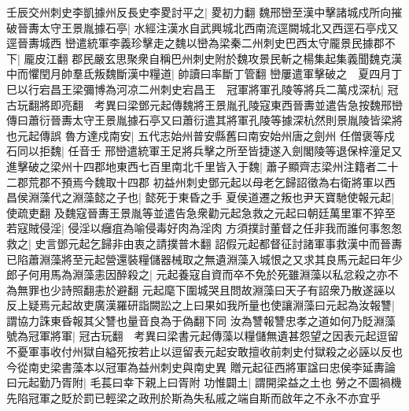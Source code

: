 壬辰交州刺史李凱據州反長史李畟討平之|{
	畟初力翻}
魏邢巒至漢中擊諸城戍所向摧破晉夀太守王景胤據石亭|{
	水經注漢水自武興城北西南流逕闕城北又西逕石亭戍又逕晉夀城西}
巒遣統軍李義珍擊走之魏以巒為梁秦二州刺史巴西太守龎景民據郡不下|{
	龎皮江翻}
郡民嚴玄思聚衆自稱巴州刺史附於魏攻景民斬之楊集起集義聞魏克漢中而懼閏月帥羣氐叛魏斷漢中糧道|{
	帥讀曰率斷丁管翻}
巒屢遣軍擊破之　夏四月丁巳以行宕昌王梁彌博為河凉二州刺史宕昌王　冠軍將軍孔陵等將兵二萬戍深杭|{
	冠古玩翻將即亮翻　考異曰梁鄧元起傳魏將王景胤孔陵寇東西晉夀並遣告急按魏邢巒傳曰蕭衍晉夀太守王景胤據石亭又曰蕭衍遣其將軍孔陵等據深杭然則景胤陵皆梁將也元起傳誤}
魯方達戍南安|{
	五代志始州普安縣舊曰南安始州唐之劍州}
任僧褒等戍石同以拒魏|{
	任音壬}
邢巒遣統軍王足將兵擊之所至皆捷遂入劍閣陵等退保梓潼足又進擊破之梁州十四郡地東西七百里南北千里皆入于魏|{
	蕭子顯齊志梁州注籍者二十二郡荒郡不預焉今魏取十四郡}
初益州刺史鄧元起以母老乞歸詔徵為右衛將軍以西昌侯淵藻代之淵藻懿之子也|{
	懿死于東昏之手}
夏侯道遷之叛也尹天寶馳使報元起|{
	使疏吏翻}
及魏寇晉夀王景胤等並遣告急衆勸元起急救之元起曰朝廷萬里軍不猝至若寇賊侵淫|{
	侵淫以癰疽為喻侵毒好肉為淫肉}
方須撲討董督之任非我而誰何事怱怱救之|{
	史言鄧元起乞歸非由衷之請撲普木翻}
詔假元起都督征討諸軍事救漢中而晉夀已陷蕭淵藻將至元起營還裝糧儲器械取之無遺淵藻入城恨之又求其良馬元起曰年少郎子何用馬為淵藻恚因醉殺之|{
	元起養寇自資而卒不免於死雖淵藻以私忿殺之亦不為無罪也少詩照翻恚於避翻}
元起麾下圍城哭且問故淵藻曰天子有詔衆乃散遂誣以反上疑焉元起故吏廣漢羅研詣闕訟之上曰果如我所量也使讓淵藻曰元起為汝報讐|{
	謂協力誅東昏報其父讐也量音良為于偽翻下同}
汝為讐報讐忠孝之道如何乃貶淵藻號為冠軍將軍|{
	冠古玩翻　考異曰梁書元起傳藻以糧儲無遺甚怨望之因表元起逗留不憂軍事收付州獄自縊死按若止以逗留表元起安敢擅收前刺史付獄殺之必誣以反也今從南史梁書藻本以冠軍為益州刺史與南史異}
贈元起征西將軍諡曰忠侯李延夀論曰元起勤乃胥附|{
	毛萇曰幸下親上曰胥附}
功惟闢土|{
	謂開梁益之土也}
勞之不圖禍機先陷冠軍之貶於罰已輕梁之政刑於斯為失私戚之端自斯而啟年之不永不亦宜乎

